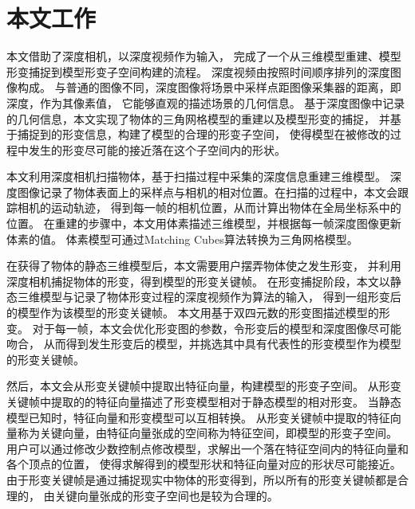 
\section{本文工作}
本文借助了深度相机，以深度视频作为输入，
完成了一个从三维模型重建、模型形变捕捉到模型形变子空间构建的流程。
深度视频由按照时间顺序排列的深度图像构成。
与普通的图像不同，深度图像将场景中采样点距图像采集器的距离，即深度，作为其像素值，
它能够直观的描述场景的几何信息。
基于深度图像中记录的几何信息，本文实现了物体的三角网格模型的重建以及模型形变的捕捉，
并基于捕捉到的形变信息，构建了模型的合理的形变子空间，
使得模型在被修改的过程中发生的形变尽可能的接近落在这个子空间内的形状。

本文利用深度相机扫描物体，基于扫描过程中采集的深度信息重建三维模型。
深度图像记录了物体表面上的采样点与相机的相对位置。在扫描的过程中，本文会跟踪相机的运动轨迹，
得到每一帧的相机位置，从而计算出物体在全局坐标系中的位置。
在重建的步骤中，本文用体素描述三维模型，并根据每一帧深度图像更新体素的值。
体素模型可通过Matching Cubes\cite{lorensen1987marching}算法转换为三角网格模型。

在获得了物体的静态三维模型后，本文需要用户摆弄物体使之发生形变，
并利用深度相机捕捉物体的形变，得到模型的形变关键帧。
在形变捕捉阶段，本文以静态三维模型与记录了物体形变过程的深度视频作为算法的输入，
得到一组形变后的模型作为该模型的形变关键帧。
本文用基于双四元数的形变图描述模型的形变。
对于每一帧，本文会优化形变图的参数，令形变后的模型和深度图像尽可能吻合，
从而得到发生形变后的模型，并挑选其中具有代表性的形变模型作为模型的形变关键帧。

然后，本文会从形变关键帧中提取出特征向量，构建模型的形变子空间。
从形变关键帧中提取的的特征向量描述了形变模型相对于静态模型的相对形变。
当静态模型已知时，特征向量和形变模型可以互相转换。
从形变关键帧中提取的特征向量称为关键向量，由特征向量张成的空间称为特征空间，即模型的形变子空间。
用户可以通过修改少数控制点修改模型，求解出一个落在特征空间内的特征向量和各个顶点的位置，
使得求解得到的模型形状和特征向量对应的形状尽可能接近。
由于形变关键帧是通过捕捉现实中物体的形变得到，所以所有的形变关键帧都是合理的，
由关键向量张成的形变子空间也是较为合理的。